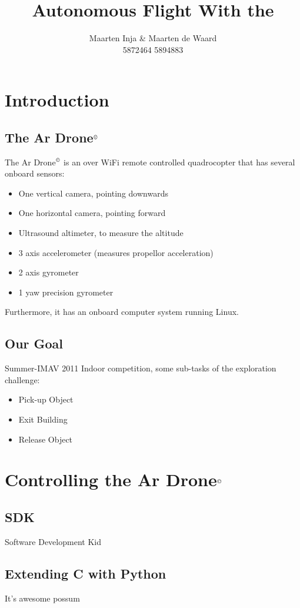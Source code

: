 \documentclass[a4paper,10pt]{article}
\title{Autonomous Flight With the \Ardrone}
\author{Maarten Inja \& Maarten de Waard\\\small 5872464 5894883}
\newcommand{\Ardrone}{Ar Drone$^{\copyright}$ }
\begin{document}
\maketitle

\section{Introduction}

\subsection{The \Ardrone}
The \Ardrone is an over WiFi remote controlled quadrocopter that has several onboard sensors:
\begin{itemize}
	\item One vertical camera, pointing downwards
	\item One horizontal camera, pointing forward 
	\item Ultrasound altimeter, to measure the altitude
    \item 3 axis accelerometer (measures propellor acceleration)
    \item 2 axis gyrometer 
    \item 1 yaw precision gyrometer
\end{itemize}
Furthermore, it has an onboard computer system running Linux. 


\subsection{Our Goal}
Summer-IMAV 2011 Indoor competition, some sub-tasks of the exploration challenge:
\begin{itemize}
    \item Pick-up Object
    \item Exit Building
    \item Release Object
\end{itemize}

\section{Controlling the \Ardrone}

\subsection{SDK}
Software Development Kid

\subsection{Extending C with Python}
It's awesome possum
\end{document}
